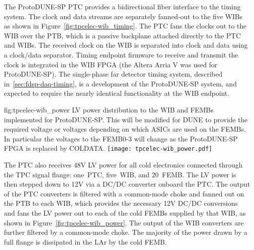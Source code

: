The ProtoDUNE-SP PTC provides a bidirectional fiber interface to the
timing system. The clock and data
streams are separately fanned-out to the five WIBs as shown in
Figure~\ref{fig:tpcelec-wib_timing}. The PTC fans the clocks out to the WIB over the
PTB, which is a passive backplane attached directly to the PTC and
WIBs.  The received clock on the WIB is separated into clock and
data using a clock/data separator. Timing endpoint firmware to receive and transmit
the clock is integrated in the WIB FPGA (the Altera Arria V was used for ProtoDUNE-SP).
The single-phase far detector timing system, described in~\ref{sec:fdsp-daq-timing}, is a development of the ProtoDUNE-SP system, and expected to require the nearly identical functionality at the WIB endpoint.

\begin{dunefigure}
{fig:tpcelec-wib_power}
{LV power distribution to the WIB and FEMBs implemented for ProtoDUNE-SP. This will be modified for DUNE to provide the required voltage or voltages depending on which ASICs are used on the FEMBs. In particular the voltages to the FEMB0-3 will change as the ProtoDUNE-SP FPGA is replaced by COLDATA. }
\texttt{[image: tpcelec-wib\_power.pdf]}
\end{dunefigure}

The PTC also receives 48V LV power for all cold
electronics connected through the TPC signal flange: one~PTC, five~WIB, and 20~FEMB. The LV power is then stepped down
to 12V via a DC/DC converter onboard the PTC. The output of the PTC converters is filtered with a common-mode choke and fanned out
on the PTB to each WIB, which provides the necessary 12V DC/DC conversions and fans
the LV power out to each of the cold FEMBs supplied by that WIB, 
as shown in Figure~\ref{fig:tpcelec-wib_power}. The output of the WIB converters are further filtered by a common-mode choke. The 
majority of the power drawn by a full flange is dissipated in the LAr by the cold FEMB.


